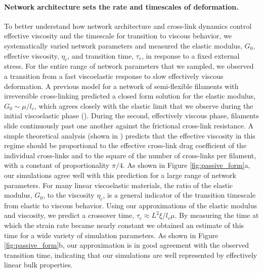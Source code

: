 \documentclass[10pt,letterpaper]{article}
\begin{document}
\paragraph{Network architecture sets the rate and timescales of deformation.}  To better understand how network architecture and cross-link dynamics control effective viscosity and the timescale for transition to viscous behavior, we systematically varied network parameters and measured the elastic modulus, $G_0$, effective viscosity, $\eta_c$, and transition time, $\tau_c$, in response to a fixed external stress. For the entire range of network parameters that we sampled, we observed a transition from a fast viscoelastic response to slow effectively viscous deformation.  A previous model \cite{theo_hlm} for a network of semi-flexible filaments with irreversible cross-linking predicted a closed form solution for the elastic modulus, $G_0 \sim \mu/l_c$, which agrees closely with the elastic limit that we observe during the initial viscoelastic phase ().  During the second, effectively viscous phase, filaments slide continuously past one another against the frictional cross-link resistance.  A simple theoretical analysis (shown in ) predicts that the effective viscosity in this regime should be proportional to the effective cross-link drag coefficient of the individual cross-links and to the square of the number of cross-links per filament, with a constant of proportionality $\pi/4$. As shown in Figure \ref{fig:passive_form}a, our simulations agree well with this prediction for a large range of network parameters.  For many linear viscoelastic materials, the ratio of the elastic modulus, $G_0$, to the viscosity $\eta_c$, is a general indicator of the transition timescale from elastic to viscous behavior\cite{mccrum1997principles}. Using our approximations of the elastic modulus and viscosity, we predict a crossover time, $\tau_c \approx L^2\xi/l_c\mu$. By measuring the time at which the strain rate became nearly constant we obtained an estimate of this time for a wide variety of simulation parameters. As shown in Figure \ref{fig:passive_form}b, our approximation is in good agreement with the observed transition time, indicating that our simulations are well represented by effectively linear bulk properties. 
\end{document}
